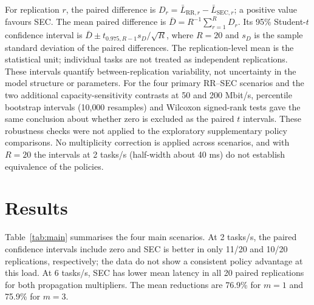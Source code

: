 \documentclass[conference]{IEEEtran}
\begin{document}
For replication $r$, the paired difference is $D_r=\bar{L}_{\mathrm{RR},r}-\bar{L}_{\mathrm{SEC},r}$; a positive value favours SEC. The mean paired difference is $\bar{D}=R^{-1}\sum_{r=1}^{R}D_r$. Its 95\% Student-$t$ confidence interval is $\bar{D}\pm t_{0.975,R-1}s_D/\sqrt{R}$, where $R=20$ and $s_D$ is the sample standard deviation of the paired differences. The replication-level mean is the statistical unit; individual tasks are not treated as independent replications. These intervals quantify between-replication variability, not uncertainty in the model structure or parameters. For the four primary RR--SEC scenarios and the two additional capacity-sensitivity contrasts at 50 and 200 Mbit/s, percentile bootstrap intervals (10{,}000 resamples) and Wilcoxon signed-rank tests gave the same conclusion about whether zero is excluded as the paired $t$ intervals. These robustness checks were not applied to the exploratory supplementary policy comparisons. No multiplicity correction is applied across scenarios, and with $R=20$ the intervals at 2 tasks/s (half-width about 40 ms) do not establish equivalence of the policies.

\section{Results}
Table~\ref{tab:main} summarises the four main scenarios. At 2 tasks/s, the paired confidence intervals include zero and SEC is better in only 11/20 and 10/20 replications, respectively; the data do not show a consistent policy advantage at this load. At 6 tasks/s, SEC has lower mean latency in all 20 paired replications for both propagation multipliers. The mean reductions are 76.9\% for $m=1$ and 75.9\% for $m=3$.

\begin{table}[t]
\caption{Mean Latency and Paired Differences in the Event-Driven Model (100-Mbit/s Ingress and Egress)}
\label{tab:main}
\centering
\footnotesize
{}
\end{table}
\end{document}
